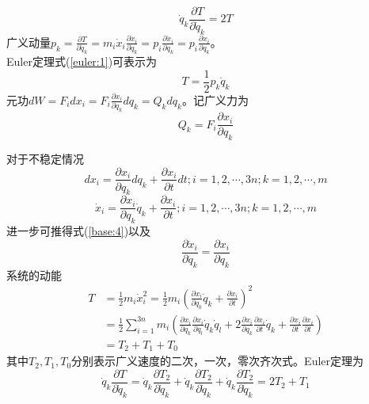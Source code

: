 \documentclass[12pt]{article}
\numberwithin{equation}{section}
\begin{document}
        \begin{equation}\label{euler:1}
            \dot{q}_k\frac{\partial T}{\partial \dot{q}_k}=2T
        \end{equation}
        广义动量$p_k=\frac{\partial T}{\partial \dot{q}_k}=m_i\dot{x}_i\frac{\partial \dot{x}_i}{\partial \dot{q}_k}
        =p_i\frac{\partial \dot{x}_i}{\partial \dot{q}_k}=p_i\frac{\partial x_i}{\partial q_k}$。\\
        Euler定理式(\ref{euler:1})可表示为
        \begin{equation}\label{base:9}
            T=\frac{1}{2}p_k\dot{q}_k
        \end{equation}
        元功$dW=F_idx_i=F_i\frac{\partial x_i}{\partial q_k}dq_k=Q_kdq_k$。记广义力为
        \begin{equation}\label{base:10}
            Q_k=F_i\frac{\partial x_i}{\partial q_k}
        \end{equation}

        对于不稳定情况
        \begin{equation}\label{base:11}
            dx_i=\frac{\partial x_i}{\partial q_k}dq_k+\frac{\partial x_i}{\partial t}dt;i=1,2,\cdots,3n;k=1,2,\cdots,m
        \end{equation}
        \begin{equation}\label{base:12}
            \dot{x}_i=\frac{\partial x_i}{\partial q_k}\dot{q}_k+\frac{\partial x_i}{\partial t};i=1,2,\cdots,3n;k=1,2,\cdots,m
        \end{equation}
        进一步可推得式(\ref{base:4})以及
        \begin{equation}\label{base:13}
            \frac{\partial \ddot{x}_i}{\partial \ddot{q}_k}=\frac{\partial x_i}{\partial q_k}
        \end{equation}
        系统的动能
        \begin{equation}\label{base:14}
            \begin{aligned}
                T&=\frac{1}{2}m_i\dot{x}_i^2=\frac{1}{2}m_i\left(\frac{\partial x_i}{\partial q_k}\dot{q}_k+\frac{\partial x_i}{\partial t}\right)^2\\
                &=\frac{1}{2}\sum_{i=1}^{3n}m_i\left(\frac{\partial x_i}{\partial q_k}\frac{\partial x_i}{\partial q_l}\dot{q}_k\dot{q}_l
                +2\frac{\partial x_i}{\partial q_k}\frac{\partial x_i}{\partial t}\dot{q}_k
                +\frac{\partial x_i}{\partial t}\frac{\partial x_i}{\partial t}\right)\\
                &=T_2+T_1+T_0
            \end{aligned}
        \end{equation}
        其中$T_2,T_1,T_0$分别表示广义速度的二次，一次，零次齐次式。Euler定理为
        \begin{equation}\label{euler:2}
            \dot{q}_k\frac{\partial T}{\partial \dot{q}_k}=\dot{q}_k\frac{\partial T_2}{\partial \dot{q}_k}+\dot{q}_k\frac{\partial T_2}{\partial \dot{q}_k}+\dot{q}_k\frac{\partial T_2}{\partial \dot{q}_k}=2T_2+T_1
        \end{equation}
\end{document}
